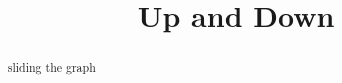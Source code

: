 \documentclass{ximera}
\title{Up and Down}
\begin{document}
\begin{abstract}
sliding the graph
\end{abstract}
\maketitle
\end{document}
